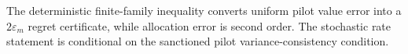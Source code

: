 The deterministic finite-family inequality converts uniform pilot value error into a \(2\varepsilon_m\) regret certificate, while allocation error is second order.  The stochastic rate statement is conditional on the sanctioned pilot variance-consistency condition.